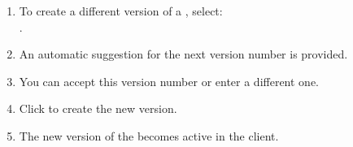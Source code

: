 
\begin{enumerate}
\item To create a different version of a \gdproject{}, select:\\
.
\item An automatic suggestion for the next version number is provided.  
\item You can accept this version number or enter a different one.  
\item Click  to create the new version. 
\item The new version of the \gdproject{} becomes active in the client. 
\end{enumerate}
